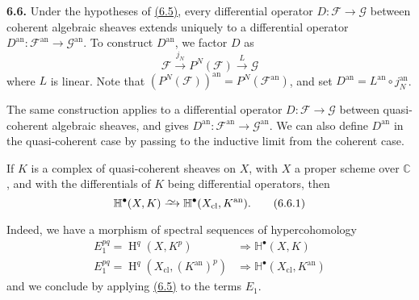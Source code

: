 \documentclass{report}
\newenvironment{rmenv}[1]
  {\phantomsection\par\medskip\noindent\textbf{#1.}\rmfamily}
  {\par\medskip}
\newcommand{\scr}[1]{{\mathscr{#1}}}
\newcommand{\CC}{\mathbb{C}}
\newcommand{\an}{\mathrm{an}}
\newcommand{\cl}{\mathrm{cl}}
\newcommand{\simto}{\xrightarrow{\raisebox{-0.7ex}[0ex][0ex]{$\sim$}}}
\DeclareMathOperator{\HH}{H}
\newcommand{\oldpage}[1]{\marginpar{\footnotesize$\Big\vert$ \textit{p.~#1}}}
\begin{document}
\oldpage{101}

\begin{rmenv}{6.6}
\label{II.6.6}
  Under the hypotheses of \hyperref[II.6.5]{(6.5)}, every differential operator $D\colon\scr{F}\to\scr{G}$ between coherent algebraic sheaves extends uniquely to a differential operator $D^\an\colon\scr{F}^\an\to\scr{G}^\an$.
  To construct $D^\an$, we factor $D$ as
  \[
    \scr{F} \xrightarrow{j_N} P^N(\scr{F}) \xrightarrow{L} \scr{G}
  \]
  where $L$ is linear.
  Note that $(P^N(\scr{F}))^\an=P^N(\scr{F}^\an)$, and set $D^\an=L^\an\circ j_N^\an$.

  The same construction applies to a differential operator $D\colon\scr{F}\to\scr{G}$ between quasi-coherent algebraic sheaves, and gives $D^\an\colon\scr{F}^\an\to\scr{G}^\an$.
  We can also define $D^\an$ in the quasi-coherent case by passing to the inductive limit from the coherent case.

  If $K$ is a complex of quasi-coherent sheaves on $X$, with $X$ a proper scheme over $\CC$, and with the differentials of $K$ being differential operators, then
  \[
  \label{II.6.6.1}
    \mathbb{H}^\bullet(X,K) \simto \mathbb{H}^\bullet(X_\cl,K^\an).
  \tag{6.6.1}
  \]

  Indeed, we have a morphism of spectral sequences of hypercohomology
  \[
    \begin{aligned}
      E_1^{pq} = \HH^q(X,K^p)
      &\Rightarrow \mathbb{H}^\bullet(X,K)
    \\E_1^{pq} = \HH^q(X_\cl,(K^\an)^p)
      &\Rightarrow \mathbb{H}^\bullet(X_\cl,K^\an)
    \end{aligned}
  \]
  and we conclude by applying \hyperref[II.6.5]{(6.5)} to the terms $E_1$.
\end{rmenv}
\end{document}
